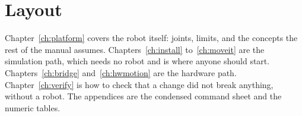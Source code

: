 \section{Layout}

Chapter~\ref{ch:platform} covers the robot itself: joints, limits, and the
concepts the rest of the manual assumes. Chapters~\ref{ch:install}
to~\ref{ch:moveit} are the simulation path, which needs no robot and is where
anyone should start. Chapters~\ref{ch:bridge} and~\ref{ch:hwmotion} are the
hardware path. Chapter~\ref{ch:verify} is how to check that a change did not break
anything, without a robot. The appendices are the condensed command sheet and the
numeric tables.
